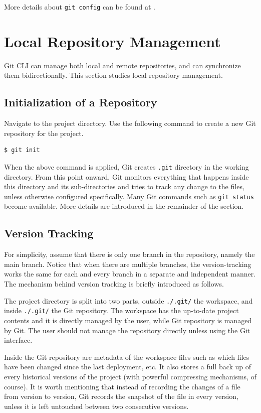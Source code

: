 More details about \verb|git config| can be found at \cite{git2025reference}.

\section{Local Repository Management}

Git CLI can manage both local and remote repositories, and can synchronize them bidirectionally. This section studies local repository management.

\subsection{Initialization of a Repository}

Navigate to the project directory. Use the following command to create a new Git repository for the project.
\begin{lstlisting}
$ git init
\end{lstlisting}
When the above command is applied, Git creates \verb|.git| directory in the working directory. From this point onward, Git monitors everything that happens inside this directory and its sub-directories and tries to track any change to the files, unless otherwise configured specifically. Many Git commands such as \verb|git status| become available. More details are introduced in the remainder of the section.

\subsection{Version Tracking}

For simplicity, assume that there is only one branch in the repository, namely the main branch. Notice that when there are multiple branches, the version-tracking works the same for each and every branch in a separate and independent manner. The mechanism behind version tracking is briefly introduced as follows.

The project directory is split into two parts, outside \verb|./.git/| the workspace, and inside \verb|./.git/| the Git repository. The workspace has the up-to-date project contents and it is directly managed by the user, while Git repository is managed by Git. The user should not manage the repository directly unless using the Git interface.

Inside the Git repository are metadata of the workspace files such as which files have been changed since the last deployment, etc. It also stores a full back up of every historical versions of the project (with powerful compressing mechanisms, of course). It is worth mentioning that instead of recording the changes of a file from version to version, Git records the snapshot of the file in every version, unless it is left untouched between two consecutive versions.

